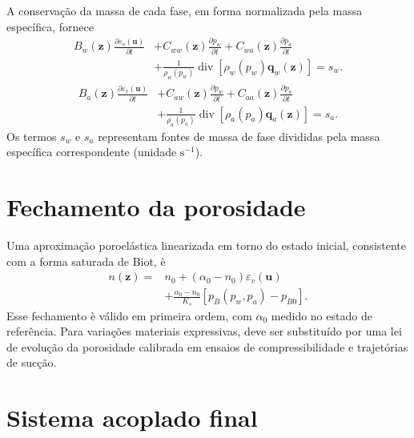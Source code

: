 \documentclass[11pt,a4paper]{article}
\numberwithin{equation}{section}
\newcommand{\Div}{\operatorname{div}}
\begin{document}
A conserva\c{c}\~ao da massa de cada fase, em forma normalizada pela
massa espec\'ifica, fornece
\begin{equation}
\boxed{\begin{aligned}
B_w(\mathbf z)\frac{\partial\varepsilon_v(\mathbf u)}{\partial t}
&+C_{ww}(\mathbf z)\frac{\partial p_w}{\partial t}
+C_{wa}(\mathbf z)\frac{\partial p_a}{\partial t}\\
&+\frac{1}{\rho_w(p_w)}\Div\left[\rho_w(p_w)\mathbf q_w(\mathbf z)\right]=s_w.
\end{aligned}}
\end{equation}
\begin{equation}
\boxed{\begin{aligned}
B_a(\mathbf z)\frac{\partial\varepsilon_v(\mathbf u)}{\partial t}
&+C_{aw}(\mathbf z)\frac{\partial p_w}{\partial t}
+C_{aa}(\mathbf z)\frac{\partial p_a}{\partial t}\\
&+\frac{1}{\rho_a(p_a)}\Div\left[\rho_a(p_a)\mathbf q_a(\mathbf z)\right]=s_a.
\end{aligned}}
\end{equation}
Os termos $s_w$ e $s_a$ representam fontes de massa de fase divididas
pela massa espec\'ifica correspondente (unidade $\mathrm{s}^{-1}$).

\section{Fechamento da porosidade}

Uma aproxima\c{c}\~ao poroel\'astica linearizada em torno do estado
inicial, consistente com a forma saturada de Biot, \`e
\begin{equation}
\boxed{\begin{aligned}
n(\mathbf z)={}&n_0+(\alpha_0-n_0)\varepsilon_v(\mathbf u)\\
&+\frac{\alpha_0-n_0}{K_s}
\left[p_B(p_w,p_a)-p_{B0}\right].
\end{aligned}}
\end{equation}
Esse fechamento \`e v\'alido em primeira ordem, com $\alpha_0$ medido
no estado de refer\^encia. Para varia\c{c}\~oes materiais expressivas,
deve ser substitu\'ido por uma lei de evolu\c{c}\~ao da porosidade
calibrada em ensaios de compressibilidade e trajet\'orias de suc\c{c}\~ao.

\section{Sistema acoplado final}
\end{document}
